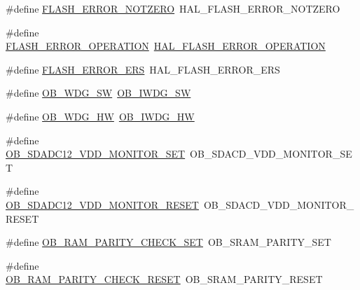 \begin{DoxyCompactItemize}
\item 
\#define \hyperlink{group___h_a_l___f_l_a_s_h___aliased___defines_ga987edd2bf3a39310a655473718d9b495}{F\+L\+A\+S\+H\+\_\+\+E\+R\+R\+O\+R\+\_\+\+N\+O\+T\+Z\+E\+RO}~H\+A\+L\+\_\+\+F\+L\+A\+S\+H\+\_\+\+E\+R\+R\+O\+R\+\_\+\+N\+O\+T\+Z\+E\+RO
\item 
\#define \hyperlink{group___h_a_l___f_l_a_s_h___aliased___defines_gaae29e90680573edfa4e11e07b2557f16}{F\+L\+A\+S\+H\+\_\+\+E\+R\+R\+O\+R\+\_\+\+O\+P\+E\+R\+A\+T\+I\+ON}~\hyperlink{group___f_l_a_s_h___error___code_gafa1433e0ca2366478928c04244310d44}{H\+A\+L\+\_\+\+F\+L\+A\+S\+H\+\_\+\+E\+R\+R\+O\+R\+\_\+\+O\+P\+E\+R\+A\+T\+I\+ON}
\item 
\#define \hyperlink{group___h_a_l___f_l_a_s_h___aliased___defines_gaf908de74b3e013ed30976d9e645354e2}{F\+L\+A\+S\+H\+\_\+\+E\+R\+R\+O\+R\+\_\+\+E\+RS}~H\+A\+L\+\_\+\+F\+L\+A\+S\+H\+\_\+\+E\+R\+R\+O\+R\+\_\+\+E\+RS
\item 
\#define \hyperlink{group___h_a_l___f_l_a_s_h___aliased___defines_gac332a5aa5da146e19f3c39067220f0f8}{O\+B\+\_\+\+W\+D\+G\+\_\+\+SW}~\hyperlink{group___f_l_a_s_h_ex___option___bytes___i_watchdog_ga5a357e232c955444c3f2ccb9a937ffce}{O\+B\+\_\+\+I\+W\+D\+G\+\_\+\+SW}
\item 
\#define \hyperlink{group___h_a_l___f_l_a_s_h___aliased___defines_gae9a94b5f21aaa5dd5558095fa684b5a3}{O\+B\+\_\+\+W\+D\+G\+\_\+\+HW}~\hyperlink{group___f_l_a_s_h_ex___option___bytes___i_watchdog_gadfcbfa963d79c339ec8e2d5a7734e47a}{O\+B\+\_\+\+I\+W\+D\+G\+\_\+\+HW}
\item 
\#define \hyperlink{group___h_a_l___f_l_a_s_h___aliased___defines_ga28d03f0c0e87570a3bc2faa4e720b8e3}{O\+B\+\_\+\+S\+D\+A\+D\+C12\+\_\+\+V\+D\+D\+\_\+\+M\+O\+N\+I\+T\+O\+R\+\_\+\+S\+ET}~O\+B\+\_\+\+S\+D\+A\+C\+D\+\_\+\+V\+D\+D\+\_\+\+M\+O\+N\+I\+T\+O\+R\+\_\+\+S\+ET
\item 
\#define \hyperlink{group___h_a_l___f_l_a_s_h___aliased___defines_ga330d35b134c5a576318103b718559b11}{O\+B\+\_\+\+S\+D\+A\+D\+C12\+\_\+\+V\+D\+D\+\_\+\+M\+O\+N\+I\+T\+O\+R\+\_\+\+R\+E\+S\+ET}~O\+B\+\_\+\+S\+D\+A\+C\+D\+\_\+\+V\+D\+D\+\_\+\+M\+O\+N\+I\+T\+O\+R\+\_\+\+R\+E\+S\+ET
\item 
\#define \hyperlink{group___h_a_l___f_l_a_s_h___aliased___defines_ga98952cd374b07146bb79583fd61ef6e6}{O\+B\+\_\+\+R\+A\+M\+\_\+\+P\+A\+R\+I\+T\+Y\+\_\+\+C\+H\+E\+C\+K\+\_\+\+S\+ET}~O\+B\+\_\+\+S\+R\+A\+M\+\_\+\+P\+A\+R\+I\+T\+Y\+\_\+\+S\+ET
\item 
\#define \hyperlink{group___h_a_l___f_l_a_s_h___aliased___defines_gab425a7c5a822ef819107a93463361bd9}{O\+B\+\_\+\+R\+A\+M\+\_\+\+P\+A\+R\+I\+T\+Y\+\_\+\+C\+H\+E\+C\+K\+\_\+\+R\+E\+S\+ET}~O\+B\+\_\+\+S\+R\+A\+M\+\_\+\+P\+A\+R\+I\+T\+Y\+\_\+\+R\+E\+S\+ET

\end{DoxyCompactItemize}
